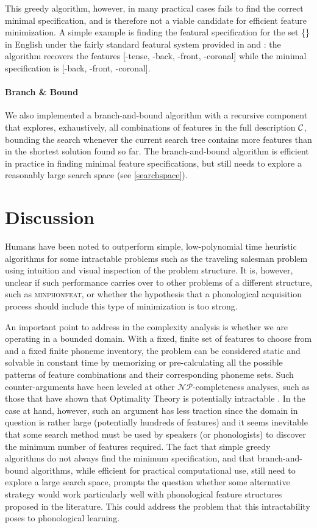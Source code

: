 \documentclass[11pt,a4paper]{article}
\begin{document}
This greedy algorithm, however, in many practical cases fails to find the correct minimal specification, and is therefore not a viable candidate for efficient feature minimization. A simple example is finding the featural specification for the set \{\} in English under the fairly standard featural system provided in  and : the algorithm recovers the features [-tense, -back, -front, -coronal] while the minimal specification is [-back, -front, -coronal].

\paragraph{Branch \& Bound} We also implemented a branch-and-bound algorithm with a recursive component that explores, exhaustively, all combinations of features in the full description $\mathcal{C}$, bounding the search whenever the current search tree contains more features than in the shortest solution found so far. The branch-and-bound algorithm is efficient in practice in finding minimal feature specifications, but still needs to explore a reasonably large search space (see \cref{searchspace}).

\section{Discussion}

Humans have been noted to outperform simple, low-polynomial time heuristic algorithms for some intractable problems such as the traveling salesman problem \cite{macgregor1996} using intuition and visual inspection of the problem structure. It is, however, unclear if such performance carries over to other problems of a different structure, such as \textsc{minphonfeat}, or whether the hypothesis that a phonological acquisition process should include this type of minimization is too strong.

An important point to address in the complexity analysis is whether we are operating in a bounded domain.  With a fixed, finite set of features to choose from and a fixed finite phoneme inventory, the problem can be considered static and solvable in constant time by memorizing or pre-calculating all the possible patterns of feature combinations and their corresponding phoneme sets.  Such counter-arguments have been leveled \cite{kornai2006} at other $\mathcal{NP}$-completeness analyses, such as those that have shown that Optimality Theory is potentially intractable \cite{eisner2000,idsardi2006}.  In the case at hand, however, such an argument has less traction since the domain in question is rather large (potentially hundreds of features) and it seems inevitable that some search method must be used by speakers (or phonologists) to discover the minimum number of features required.  The fact that simple greedy algorithms do not always find the minimum specification, and that branch-and-bound algorithms, while efficient for practical computational use, still need to explore a large search space, prompts the question whether some alternative  strategy would work particularly well with phonological feature structures proposed in the literature.  This could address the problem that this intractability poses to phonological learning.
\end{document}
